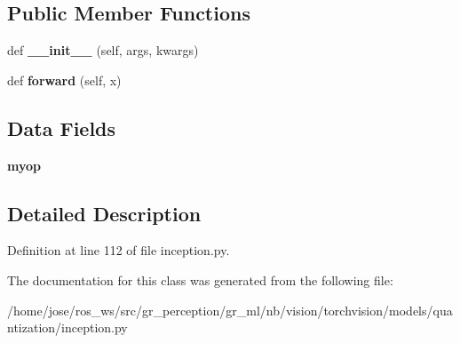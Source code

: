 \subsection*{Public Member Functions}
\begin{DoxyCompactItemize}
\item 
\mbox{\label{classtorchvision_1_1models_1_1quantization_1_1inception_1_1QuantizableInceptionB_a2f65dde04a769faf8d288201f84462d1}} 
def {\bfseries \+\_\+\+\_\+init\+\_\+\+\_\+} (self, args, kwargs)
\item 
\mbox{\label{classtorchvision_1_1models_1_1quantization_1_1inception_1_1QuantizableInceptionB_aa1e445315521977dbb23fc548685b8ab}} 
def {\bfseries forward} (self, x)
\end{DoxyCompactItemize}
\subsection*{Data Fields}
\begin{DoxyCompactItemize}
\item 
\mbox{\label{classtorchvision_1_1models_1_1quantization_1_1inception_1_1QuantizableInceptionB_a3fe62c1589139c767e42f0598b9316a3}} 
{\bfseries myop}
\end{DoxyCompactItemize}


\subsection{Detailed Description}


Definition at line 112 of file inception.\+py.



The documentation for this class was generated from the following file\+:\begin{DoxyCompactItemize}
\item 
/home/jose/ros\+\_\+ws/src/gr\+\_\+perception/gr\+\_\+ml/nb/vision/torchvision/models/quantization/inception.\+py\end{DoxyCompactItemize}
